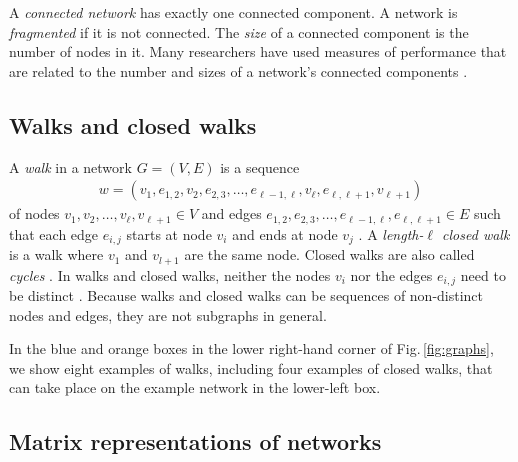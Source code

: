 \documentclass{comnet-mod}
\begin{document}
A \textit{connected network} has exactly one connected component. A network is \textit{fragmented} if it is not connected. The \textit{size} of a connected component is the number of nodes in it. Many researchers have used measures of performance that are related to the number and sizes of a network's connected components \cite{Albert2000, Shargel2003, Chaverri2010, Bradonjic2011, Bilal2013, Hossain2013, Trajanovski2013, Danziger2014, Priester2014, Ventresca2014, Wang2014a, Zhou2014, Ahmadi2015, Gong2015, LaRocca2015, Radicchi2015, Yang2015, Khansari2016, Ren2016, Schieber2016, Williams2016, DeDomenico2017, Mourier2017, daCunha2017, Phan2018, Kazawa2020, Mimar2022, Ferrari2023, Tomassini2023}.


\subsection{Walks and closed walks}\label{sec:rev:walks}

A \textit{walk} in a network $G=(V,E)$ is a sequence
\begin{align}
	w=(v_{1},e_{1,2},v_{2},e_{2,3},\dots, e_{{\ell-1},\ell},v_{\ell}, e_{\ell, {\ell+1}},v_{{\ell+1}})\nonumber
\end{align}
of nodes $v_{1},v_{2},\ldots,v_{\ell},v_{{\ell+1}}\in V$ and edges $e_{1,2},e_{2,3},\ldots,e_{{\ell-1},\ell},e_{\ell, {\ell+1}}\in E$ such that each edge $e_{i,j}$ starts at node $v_i$ and ends at node $v_j$ \cite[p.\,4]{Bollobas2013}.
A \textit{length-$\ell$ closed walk} is a walk where $v_1$ and $v_{l+1}$ are the same node. Closed walks are also called \textit{cycles} \cite{Newman2018}.
In walks and closed walks, neither the nodes $v_{i}$ nor the edges $e_{i,j}$ need to be distinct \cite[p.\,131]{Newman2018}. Because walks and closed walks can be sequences of non-distinct nodes and edges, they are not subgraphs in general. 

In the blue and orange boxes in the lower right-hand corner of Fig.\,\ref{fig:graphs}, we show eight examples of walks, including four examples of closed walks, that can take place on the example network in the lower-left box.


\subsection{Matrix representations of networks}\label{sec:rev:matrices}
\end{document}
